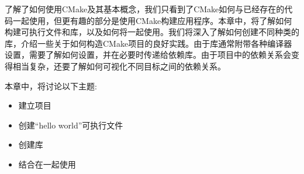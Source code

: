 了解了如何使用CMake及其基本概念，我们只看到了CMake如何与已经存在的代码一起使用，但更有趣的部分是使用CMake构建应用程序。本章中，将了解如何构建可执行文件和库，以及如何将一起使用。我们将深入了解如何创建不同种类的库，介绍一些关于如何构造CMake项目的良好实践。由于库通常附带各种编译器设置，需要了解如何设置，并在必要时传递给依赖库。由于项目中的依赖关系会变得相当复杂，还要了解如何可视化不同目标之间的依赖关系。

本章中，将讨论以下主题:

\begin{itemize}
\item 
建立项目

\item 
创建“hello world”可执行文件

\item 
创建库

\item 
结合在一起使用
\end{itemize}